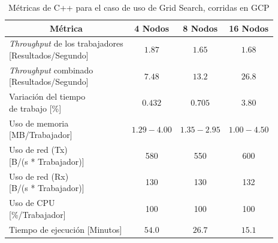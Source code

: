 \documentclass[11pt]{article}
\providecommand{\row}[1]{\parbox{150pt}{\setlength{\baselineskip}{0.2\baselineskip}\strut#1\strut}}
\newcommand{\gscap}[2]{\caption{Métricas de #1 para el caso de uso de Grid Search, corridas en #2}}
\newcommand{\english}[1]{\textit{#1}}
\begin{document}
\begin{table}[H]
\centering
\begin{tabular}{|l|c|c|c|}
\hline
\multicolumn{1}{|c|}{Métrica} & 4 Nodos & 8 Nodos & 16 Nodos \\ \hline
\row{\english{Throughput} de los trabajadores\\{[Resultados/Segundo]}} & $1.87$ & $1.65$ & $1.68$ \\ \hline
\row{\english{Throughput} combinado\\{[Resultados/Segundo]}} & $7.48$ & $13.2$ & $26.8$ \\ \hline
\row{Variación del tiempo\\de trabajo {[\%]}} & $0.432$ & $0.705$ & $3.80$ \\ \hline
\row{Uso de memoria\\{[MB/Trabajador]}} & $1.29-4.00$ & $1.35-2.95$ & $1.00-4.50$ \\ \hline
\row{Uso de red (Tx)\\{[B/(s * Trabajador)]}} & 580 & 550 & 600 \\ \hline
\row{Uso de red (Rx)\\{[B/(s * Trabajador)]}} & 130 & 130 & 132 \\ \hline
\row{Uso de CPU\\{[\%/Trabajador]}} & 100 & 100 & 100 \\ \hline
Tiempo de ejecución [Minutos] & $54.0$ & $26.7$ & $15.1$ \\ \hline
\end{tabular}
\gscap{C++}{GCP}
\end{table}
\end{document}
